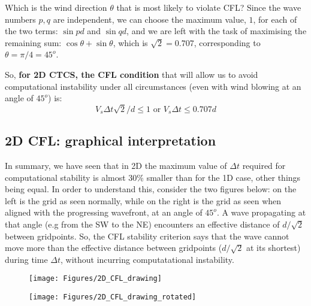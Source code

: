	Which is the wind direction $\theta$ that is most likely to violate CFL? Since the wave numbers $p,q$ are independent, we can choose the maximum value, $1$, for each of the two terms: $\sin pd$ and $\sin qd$, and we are left with the task of maximising the remaining sum: $\cos \theta + \sin \theta$, which is $\sqrt{2}=0.707$, corresponding to $\theta=\pi/4=45^o$.
	
	So, \textbf{for 2D CTCS, the CFL condition} that will allow us to avoid computational instability under all circumstances (even with wind blowing at an angle of $45^o$) is: 
	\begin{equation}
		V_s \Delta t \sqrt{2} / d \leq 1 \textrm{ or } V_s \Delta t \leq 0.707 d 
	\end{equation}
	
\subsection{2D CFL: graphical interpretation}

	In summary, we have seen that in 2D the maximum value of $\Delta t$ required for computational stability is almost 30\% smaller than for the 1D case, other things being equal. In order to understand this, consider the two figures below: on the left is the grid as seen normally, while on the right is the grid as seen when aligned with the progressing wavefront, at an angle of $45^o$.
	A wave propagating at that angle (e.g from the SW to the NE) encounters an effective distance of $d/\sqrt{2}$ between gridpoints. So, the CFL stability criterion says that the wave cannot move more than the effective distance between gridpoints ($d/\sqrt{2}$ at its shortest) during time $\Delta t$, without incurring computatational instability.
	
	\medskip
	
		\begin{figure}
			\texttt{[image: Figures/2D\_CFL\_drawing]}
		\end{figure}
	
		\begin{figure}
			\texttt{[image: Figures/2D\_CFL\_drawing\_rotated]}
		\end{figure}
	

